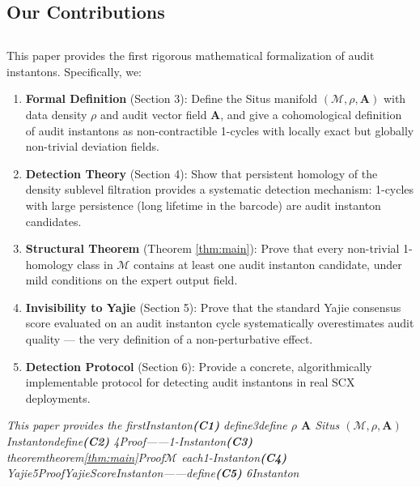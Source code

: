\documentclass[11pt,a4paper]{article}
\theoremstyle{plain}
\theoremstyle{definition}
\newcommand{\cM}{\mathcal{M}}
\begin{document}
\subsection{Our Contributions}
\subsection*{}

This paper provides the first rigorous mathematical formalization of audit 
instantons. Specifically, we:

\begin{enumerate}[label=(\textbf{C\arabic*})]
  \item \textbf{Formal Definition} (Section 3): Define the Situs manifold 
        $(\cM, \rho, \mathbf{A})$ with data density $\rho$ and audit vector 
        field $\mathbf{A}$, and give a cohomological definition of audit 
        instantons as non-contractible 1-cycles with locally exact but 
        globally non-trivial deviation fields.
  
  \item \textbf{Detection Theory} (Section 4): Show that persistent homology 
        of the density sublevel filtration provides a systematic detection 
        mechanism: 1-cycles with large persistence (long lifetime in the 
        barcode) are audit instanton candidates.
  
  \item \textbf{Structural Theorem} (Theorem \ref{thm:main}): Prove that 
        every non-trivial 1-homology class in $\cM$ contains at least one 
        audit instanton candidate, under mild conditions on the expert 
        output field.
  
  \item \textbf{Invisibility to Yajie} (Section 5): Prove that the standard 
        Yajie consensus score evaluated on an audit instanton cycle 
        systematically overestimates audit quality — the very definition 
        of a non-perturbative effect.
  
  \item \textbf{Detection Protocol} (Section 6): Provide a concrete, 
        algorithmically implementable protocol for detecting audit instantons 
        in real SCX deployments.
\end{enumerate}

\bigskip
\noindent
\textit{This paper provides the firstInstanton\textbf{(C1)} define3define $\rho$  $\mathbf{A}$ Situs $(\cM, \rho, \mathbf{A})$Instantondefine\textbf{(C2)} 4Proof——1-Instanton\textbf{(C3)} theoremtheorem\ref{thm:main}Proof$\cM$ each1-Instanton\textbf{(C4)} Yajie5ProofYajieScoreInstanton——define\textbf{(C5)} 6Instanton}
\end{document}
